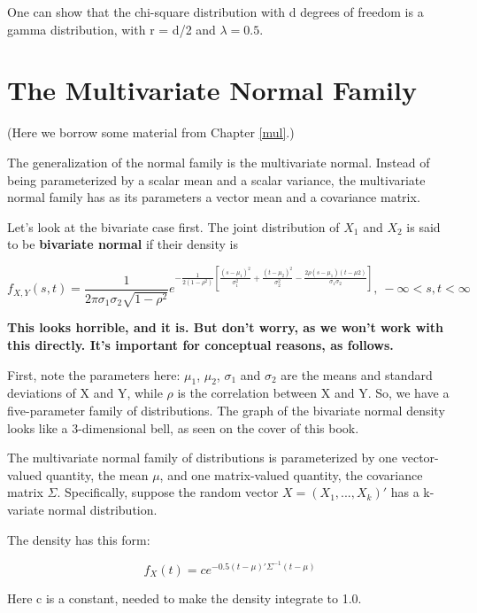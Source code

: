 One can show that the chi-square distribution with d degrees of freedom
is a gamma distribution, with r = d/2 and $\lambda = 0.5$.

\section{The Multivariate Normal Family}

(Here we borrow some material from Chapter \ref{mul}.)

The generalization of the normal family is the multivariate normal.
Instead of being parameterized by a scalar mean and a scalar variance,
the multivariate normal family has as its parameters a vector mean and
a covariance matrix.

Let's look at the bivariate case first.  The joint distribution of
$X_1$ and $X_2$ is said to be {\bf bivariate normal} if their density is

\begin{equation}
f_{X,Y}(s,t) = \frac{1}{2\pi \sigma_1 \sigma_2 \sqrt{1-\rho^2}}
e^
{-\frac{1}{2(1-\rho^2)} 
\left [
\frac{(s-\mu_1)^2}{\sigma_1^2} + \frac{(t-\mu_2)^2}{\sigma_2^2} 
-\frac
{2\rho (s-\mu_1)(t-\mu2)}
{\sigma_1 \sigma_2}
\right ]
}, ~ -\infty < s,t < \infty
\end{equation}

{\bf This looks horrible, and it is.  But don't worry, as we won't work
with this directly.  It's important for conceptual reasons, as follows.}

First, note the parameters here:  $\mu_1$, $\mu_2$, $\sigma_1$ and
$\sigma_2$ are the means and standard deviations of X and Y,
while $\rho$ is the correlation between X and Y.  So, we have a
five-parameter family of distributions.  The graph of the bivariate
normal density looks like a 3-dimensional bell, as seen on the cover of
this book.

The multivariate normal family of distributions is parameterized by one
vector-valued quantity, the mean $\mu$, and one matrix-valued quantity,
the covariance matrix $\Sigma$.  Specifically, suppose the random vector
$X = (X_1,...,X_k)'$ has a k-variate normal distribution.

The density has this form:

\begin{equation}
f_X(t) = c e^{-0.5 (t-\mu)'\Sigma^{-1}(t-\mu)}
\end{equation}

Here c is a constant, needed to make the density integrate to 1.0. 

